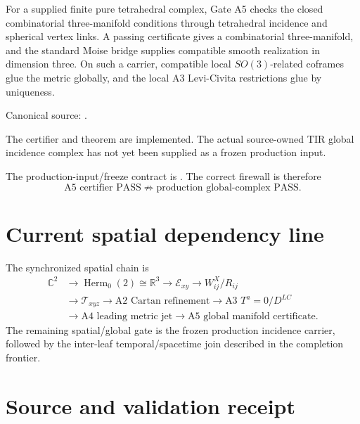 For a supplied finite pure tetrahedral complex, Gate A5 checks the closed
combinatorial three-manifold conditions through tetrahedral incidence and
spherical vertex links.  A passing certificate gives a combinatorial
three-manifold, and the standard Moise bridge supplies compatible smooth
realization in dimension three.  On such a carrier, compatible local
\(SO(3)\)-related coframes glue the metric globally, and the local A3
Levi-Civita restrictions glue by uniqueness.

Canonical source:
.

The certifier and theorem are implemented.  The actual source-owned TIR global
incidence complex has not yet been supplied as a frozen production input.

The production-input/freeze contract is
.
The correct firewall is therefore
\[
\boxed{
\text{A5 certifier PASS}
\not\Rightarrow
\text{production global-complex PASS}.
}
\]

\section{Current spatial dependency line}

The synchronized spatial chain is
\[
\boxed{
\begin{aligned}
\mathbb C^2
&\to\operatorname{Herm}_0(2)\cong\mathbb R^3
\to\mathcal E_{xy}
\to W_{ij}^{X}/R_{ij}\\
&\to\mathcal T_{xyz}
\to\text{A2 Cartan refinement}
\to\text{A3 }T^a=0/D^{LC}\\
&\to\text{A4 leading metric jet}
\to\text{A5 global manifold certificate}.
\end{aligned}
}
\]
The remaining spatial/global gate is the frozen production incidence carrier,
followed by the inter-leaf temporal/spacetime join described in the completion
frontier.

\section{Source and validation receipt}

